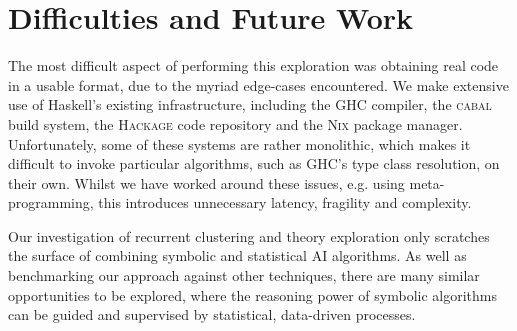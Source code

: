 \documentclass[]{default}
\begin{document}
\section{Difficulties and Future Work}\label{future-work}

The most difficult aspect of performing this exploration was obtaining real code in a usable format, due to the myriad edge-cases encountered. We make extensive use of Haskell's existing infrastructure, including the \textsc{GHC} compiler, the \textsc{cabal} build system, the \textsc{Hackage} code repository and the \textsc{Nix} package manager. Unfortunately, some of these systems are rather monolithic, which makes it difficult to invoke particular algorithms, such as \textsc{GHC}'s type class resolution, on their own. Whilst we have worked around these issues, e.g. using meta-programming, this introduces unnecessary latency, fragility and complexity.

Our investigation of recurrent clustering and theory exploration only scratches the surface of combining symbolic and statistical AI algorithms. As well as benchmarking our approach against other techniques, there are many similar opportunities to be explored, where the reasoning power of symbolic algorithms can be guided and supervised by statistical, data-driven processes.



\end{document}
